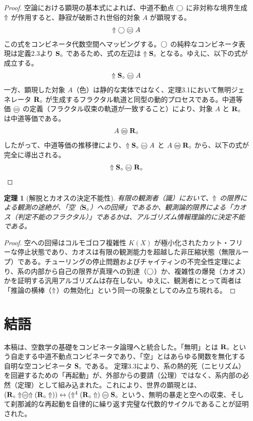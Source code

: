 \documentclass[11pt,a4paper]{ltjsarticle}
\newtheorem{theorem}{定理}[section]
\begin{document}
\begin{proof}
空論における顕現の基本式によれば、中道不動点 $\bigcirc$ に非対称な境界生成 $\Uparrow$ が作用すると、静寂が破断され世俗的対象 $A$ が顕現する。
\[ \metanegation \dfix \mweq A \]
この式をコンビネータ代数空間へマッピングする。$\bigcirc$ の純粋なコンビネータ表現は定義2.3より $\mathbf{S}_{\circ}$ であるため、式の左辺は $\Uparrow \mathbf{S}_{\circ}$ となる。ゆえに、以下の式が成立する。
\[ \metanegation \Svoid \mweq A \]
一方、顕現した対象 $A$（色）は静的な実体ではなく、定理3.1において無明ジェネレータ $\mathbf{R}_{\circ}$ が生成するフラクタル軌道と同型の動的プロセスである。中道等価 $\mweq$ の定義（フラクタル収束の軌道が一致すること）により、対象 $A$ と $\mathbf{R}_{\circ}$ は中道等価である。
\[ A \mweq \Rmw \]
したがって、中道等価の推移律により、$\metanegation \Svoid \mweq A$ と $A \mweq \Rmw$ から、以下の式が完全に導出される。
\[ \metanegation \Svoid \mweq \Rmw \]
\end{proof}

\begin{theorem}[解脱とカオスの決定不能性]
有限の観測者（識）において、$\Uparrow$ の限界による観測の途絶が、「空（$\mathbf{S}_{\circ}$）への回帰」であるか、観測論的限界による「カオス（判定不能のフラクタル）」であるかは、アルゴリズム情報理論的に決定不能である。
\end{theorem}
\begin{proof}
空への回帰はコルモゴロフ複雑性 $K(X)$ が極小化されたカット・フリーな停止状態であり、カオスは有限の観測能力を超越した非圧縮状態（無限ループ）である。チューリングの停止問題およびチャイティンの不完全性定理により、系の内部から自己の限界が真理への到達（$\bigcirc$）か、複雑性の爆発（カオス）かを証明する汎用アルゴリズムは存在しない。ゆえに、観測者にとって両者は「推論の横棒（$\Uparrow$）の無効化」という同一の現象としてのみ立ち現れる。
\end{proof}

\section{結語}
本稿は、空数学の基礎をコンビネータ論理へと統合した。「無明」とは $\mathbf{R}_{\circ}$ という自走する中道不動点コンビネータであり、「空」とはあらゆる関数を無化する自明な空コンビネータ $\mathbf{S}_{\circ}$ である。
定理3.3により、系の熱的死（ニヒリズム）を回避するための「再起動」が、外部からの要請（公理）ではなく、系内部の必然（定理）として組み込まれた。これにより、世界の顕現とは、$(\Rmw \metanegation \mweq \metanegation(\Rmw\metanegation)) \leftrightarrow (\metanegation^4(\Rmw\metanegation) \mweq \Svoid$ という、無明の暴走と空への収束、そして刹那滅的な再起動を自律的に繰り返す完璧な代数的サイクルであることが証明された。
\end{document}

